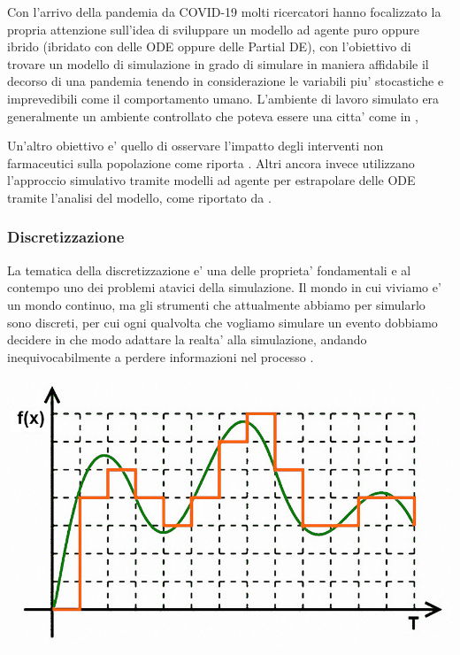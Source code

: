 Con l'arrivo della pandemia da COVID-19 molti ricercatori hanno 
focalizzato la propria attenzione sull'idea di sviluppare un modello 
ad agente puro oppure ibrido \cite{Marzban2021-pd}
(ibridato con delle ODE oppure delle Partial DE), con l'obiettivo di 
trovare un modello di simulazione in grado di simulare in maniera 
affidabile il decorso di una pandemia tenendo in considerazione le 
variabili piu' stocastiche e imprevedibili come il comportamento umano.
L'ambiente di lavoro simulato era generalmente un ambiente controllato
che poteva essere una citta' come in \cite{PRAJAPATI20232299}, 

Un'altro obiettivo e' quello di osservare l'impatto degli interventi non 
farmaceutici sulla popolazione come riporta \cite{NOVAKOVIC2022108790}
\cite{10.1371/journal.pcbi.1009149}.
Altri ancora invece utilizzano l'approccio simulativo tramite modelli ad 
agente per estrapolare delle ODE tramite l'analisi del modello, come
riportato da \cite{Nardini2021-pu}. 

\subsubsection{Discretizzazione}
La tematica della discretizzazione e' una delle proprieta' fondamentali
e al contempo uno dei problemi atavici della simulazione.
Il mondo in cui viviamo e' un mondo continuo, ma gli strumenti
che attualmente abbiamo per simularlo sono discreti, per cui 
ogni qualvolta che vogliamo simulare un evento dobbiamo decidere 
in che modo adattare la realta' alla simulazione, andando 
inequivocabilmente a perdere informazioni nel processo 
\cite{KONSTANTINOUDIS2020100319}. 

\begin{minipage}{\linewidth}
    \centering
    \includegraphics[scale=0.5]{img/figura-1-analogico-e-digitale-7ae2c4b25c8751e9a3771f91f1e65bb1f.jpg}
    \label{fig:discretization}
\end{minipage}

